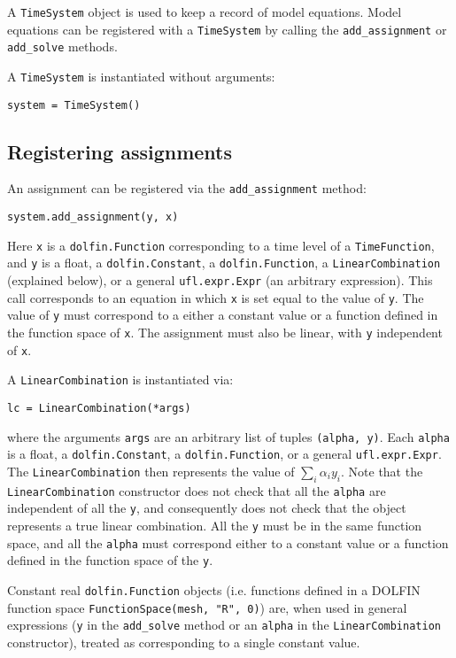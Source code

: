 \documentclass[a4paper]{book}
\begin{document}
A \verb+TimeSystem+ object is used to keep a record of model equations.
Model equations can be registered with a \verb+TimeSystem+ by calling the
\verb+add_assignment+ or \verb+add_solve+ methods.

A \verb+TimeSystem+ is instantiated without arguments:
\begin{lstlisting}
system = TimeSystem()
\end{lstlisting}

\subsection{Registering assignments}\label{sect:assignments}

An assignment can be registered via the \verb+add_assignment+ method:
\begin{lstlisting}
system.add_assignment(y, x)
\end{lstlisting}
Here \verb+x+ is a \verb+dolfin.Function+ corresponding to a time level of a
\verb+TimeFunction+, and \verb+y+ is a float, a \verb+dolfin.Constant+, a
\verb+dolfin.Function+, a \verb+LinearCombination+ (explained below), or a
general \verb+ufl.expr.Expr+ (an arbitrary expression). This call corresponds to
an equation in which \verb+x+ is set equal to the value of \verb+y+. The value
of \verb+y+ must correspond to a either a constant value or a function defined
in the function space of \verb+x+. The assignment must also be linear, with
\verb+y+ independent of \verb+x+.

A \verb+LinearCombination+ is instantiated via:
\begin{lstlisting}
lc = LinearCombination(*args)
\end{lstlisting}
where the arguments \verb+args+ are an arbitrary list of tuples
\verb+(alpha, y)+. Each \verb+alpha+ is a float, a \verb+dolfin.Constant+, a
\verb+dolfin.Function+, or a general \linebreak \verb+ufl.expr.Expr+. The
\verb+LinearCombination+ then represents the value of $\sum_i \alpha_i y_i$.
Note that the \verb+LinearCombination+ constructor does not check that all the
\verb+alpha+ are independent of all the \verb+y+, and consequently does not
check that the object represents a true linear combination. All the \verb+y+
must be in the same function space, and all the \verb+alpha+ must correspond
either to a constant value or a function defined in the function space of the
\verb+y+.

Constant real \verb+dolfin.Function+ objects (i.e. functions defined in a
DOLFIN function space \verb+FunctionSpace(mesh, "R", 0)+) are, when used in
general expressions (\verb+y+ in the \verb+add_solve+ method or an \verb+alpha+
in the \verb+LinearCombination+ constructor), treated as corresponding to a
single constant value.
\end{document}
